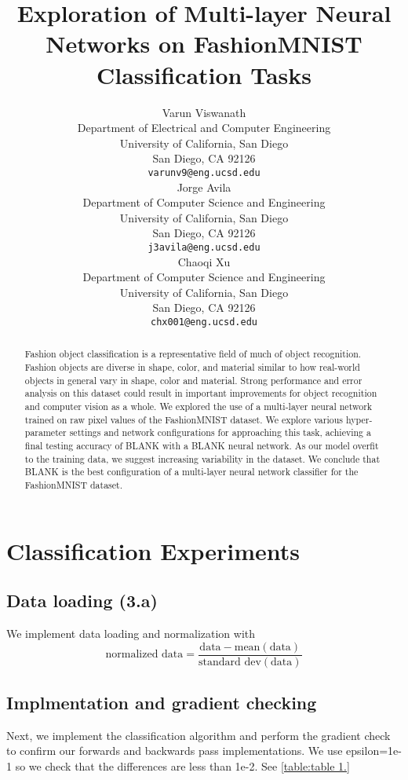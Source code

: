 \documentclass{article} %
\title{Exploration of Multi-layer Neural Networks on FashionMNIST Classification Tasks}
\author{
Varun Viswanath \\
Department of Electrical and Computer Engineering\\
University of California, San Diego\\
San Diego, CA 92126 \\
\texttt{varunv9@eng.ucsd.edu} \\
\AND
Jorge  Avila \\
Department of Computer Science and Engineering\\
University of California, San Diego\\
San Diego, CA 92126 \\
\texttt{j3avila@eng.ucsd.edu} \\
\AND
Chaoqi Xu \\
Department of Computer Science and Engineering\\
University of California, San Diego\\
San Diego, CA 92126 \\
\texttt{chx001@eng.ucsd.edu} \\
}
\begin{document}
\maketitle

\begin{abstract}
Fashion object classification is a representative field of much of object recognition. Fashion objects are diverse in shape, color, and material similar to how real-world objects in general vary in shape, color and material. Strong performance and error analysis on this dataset could result in important improvements for object recognition and computer vision as a whole. We explored the use of a multi-layer neural network trained on raw pixel values of the FashionMNIST dataset. We explore various hyper-parameter settings and network configurations for approaching this task, achieving a final testing accuracy of BLANK with a BLANK neural network. As our model overfit to the training data, we suggest increasing variability in the dataset. We conclude that BLANK is the best configuration of a multi-layer neural network classifier for the FashionMNIST dataset.
\end{abstract}


\section{Classification Experiments}

\subsection{Data loading (3.a)}
We implement data loading and normalization with $$\text{normalized data} = \frac{\text{data} - \text{mean}(\text{data})}{\text{standard dev}(\text{data})}$$


\subsection{Implmentation and gradient checking} 
Next, we implement the classification algorithm and perform the gradient check to confirm our forwards and backwards pass implementations. We use epsilon=1e-1 so we check that the differences are less than 1e-2. See \ref{table:table 1.}
\end{document}
